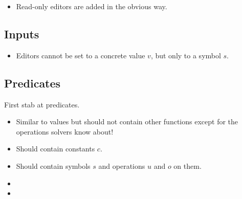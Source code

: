 
\begin{itemize}
  \item Read-only editors are added in the obvious way.
\end{itemize}



\subsection{Inputs}


\begin{itemize}
  \item Editors cannot be set to a concrete value $v$, but only to a symbol $s$.
\end{itemize}



\subsection{Predicates}


First stab at predicates.
\begin{itemize}
  \item Similar to values but should not contain other functions except for the operations \SMT solvers know about!
  \item Should contain constants $c$.
  \item Should contain symbols $s$ and operations $u$ and $o$ on them.
  \item {}
  \item {}
\end{itemize}
